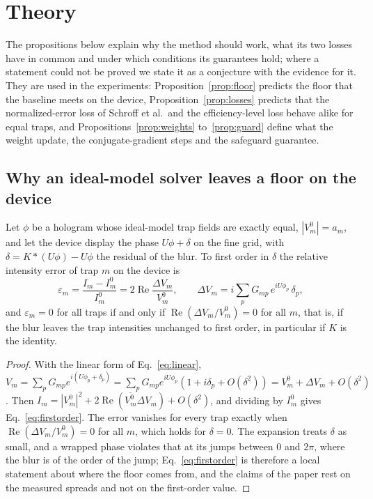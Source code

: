 \section{Theory}\label{sec:theory}

The propositions below explain why the method should work, what its two losses have in common and under which conditions its guarantees hold; where a statement could not be proved we state it as a conjecture with the evidence for it. They are used in the experiments: Proposition~\ref{prop:floor} predicts the floor that the baseline meets on the device, Proposition~\ref{prop:losses} predicts that the normalized-error loss of Schroff et al.\ and the efficiency-level loss behave alike for equal traps, and Propositions~\ref{prop:weights} to~\ref{prop:guard} define what the weight update, the conjugate-gradient steps and the safeguard guarantee.

\subsection{Why an ideal-model solver leaves a floor on the device}

\begin{proposition}\label{prop:floor}
Let $\phi$ be a hologram whose ideal-model trap fields are exactly equal, $|V_m^0|=a_m$, and let the device display the phase $U\phi+\delta$ on the fine grid, with $\delta=K*(U\phi)-U\phi$ the residual of the blur. To first order in $\delta$ the relative intensity error of trap $m$ on the device is
\begin{equation}
\varepsilon_m=\frac{I_m-I_m^0}{I_m^0}=2\operatorname{Re}\frac{\Delta V_m}{V_m^0},\qquad \Delta V_m=i\sum_pG_{mp}\,e^{iU\phi_p}\,\delta_p,\label{eq:firstorder}
\end{equation}
and $\varepsilon_m=0$ for all traps if and only if $\operatorname{Re}(\Delta V_m/V_m^0)=0$ for all $m$, that is, if the blur leaves the trap intensities unchanged to first order, in particular if $K$ is the identity.
\end{proposition}
\begin{proof}
With the linear form of Eq.~\ref{eq:linear}, $V_m=\sum_pG_{mp}e^{i(U\phi_p+\delta_p)}=\sum_pG_{mp}e^{iU\phi_p}(1+i\delta_p+O(\delta^2))=V_m^0+\Delta V_m+O(\delta^2)$. Then $I_m=|V_m^0|^2+2\operatorname{Re}(\overline{V_m^0}\Delta V_m)+O(\delta^2)$, and dividing by $I_m^0$ gives Eq.~\ref{eq:firstorder}. The error vanishes for every trap exactly when
$\operatorname{Re}(\Delta V_m/V_m^0)=0$ for all $m$, which holds for $\delta=0$. The expansion treats $\delta$ as small, and a wrapped phase violates that at its jumps between $0$ and $2\pi$, where the blur is of the order of the jump; Eq.~\ref{eq:firstorder} is therefore a local statement about where the floor comes from, and the claims of the paper rest on the measured spreads and not on the first-order value.
\end{proof}

